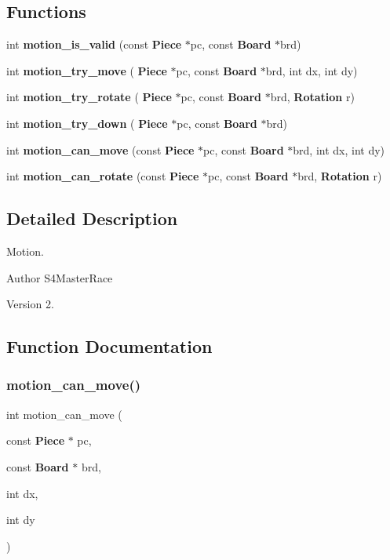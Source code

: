\subsection*{Functions}
\begin{DoxyCompactItemize}
\item 
int \textbf{ motion\+\_\+is\+\_\+valid} (const \textbf{ Piece} $\ast$pc, const \textbf{ Board} $\ast$brd)
\item 
int \textbf{ motion\+\_\+try\+\_\+move} (\textbf{ Piece} $\ast$pc, const \textbf{ Board} $\ast$brd, int dx, int dy)
\item 
int \textbf{ motion\+\_\+try\+\_\+rotate} (\textbf{ Piece} $\ast$pc, const \textbf{ Board} $\ast$brd, \textbf{ Rotation} r)
\item 
int \textbf{ motion\+\_\+try\+\_\+down} (\textbf{ Piece} $\ast$pc, const \textbf{ Board} $\ast$brd)
\item 
int \textbf{ motion\+\_\+can\+\_\+move} (const \textbf{ Piece} $\ast$pc, const \textbf{ Board} $\ast$brd, int dx, int dy)
\item 
int \textbf{ motion\+\_\+can\+\_\+rotate} (const \textbf{ Piece} $\ast$pc, const \textbf{ Board} $\ast$brd, \textbf{ Rotation} r)
\end{DoxyCompactItemize}


\subsection{Detailed Description}
Motion. 

\begin{DoxyAuthor}{Author}
S4\+Master\+Race 
\end{DoxyAuthor}
\begin{DoxyVersion}{Version}
2. 
\end{DoxyVersion}


\subsection{Function Documentation}
\mbox{\label{motion_8h_ab199a2d7f6a562940345b4ec28e32ed2}} 
\subsubsection{motion\+\_\+can\+\_\+move()}
{\footnotesize\ttfamily int motion\+\_\+can\+\_\+move (\begin{DoxyParamCaption}\item[{const \textbf{ Piece} $\ast$}]{pc,  }\item[{const \textbf{ Board} $\ast$}]{brd,  }\item[{int}]{dx,  }\item[{int}]{dy }\end{DoxyParamCaption})}

